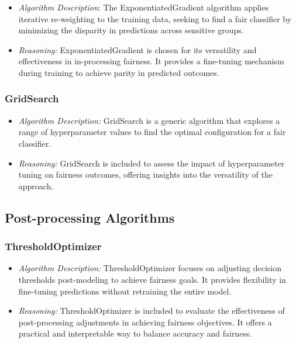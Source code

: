 \begin{itemize}

    \item \emph{Algorithm Description}: The ExponentiatedGradient algorithm applies iterative re-weighting to the training data, seeking to find a fair classifier by minimizing the disparity in predictions across sensitive groups.

    \item \emph{Reasoning:} ExponentiatedGradient is chosen for its versatility and effectiveness in in-processing fairness. It provides a fine-tuning mechanism during training to achieve parity in predicted outcomes.

\end{itemize}

\subsubsection{GridSearch}

\begin{itemize}

    \item \emph{Algorithm Description:} GridSearch is a generic algorithm that explores a range of hyperparameter values to find the optimal configuration for a fair classifier.

    \item \emph{Reasoning:} GridSearch is included to assess the impact of hyperparameter tuning on fairness outcomes, offering insights into the versatility of the approach.

\end{itemize}

\subsection{Post-processing Algorithms}

\subsubsection{ThresholdOptimizer}

\begin{itemize}

    \item \emph{Algorithm Description:} ThresholdOptimizer focuses on adjusting decision thresholds post-modeling to achieve fairness goals. It provides flexibility in fine-tuning predictions without retraining the entire model.

    \item \emph{Reasoning:} ThresholdOptimizer is included to evaluate the effectiveness of post-processing adjustments in achieving fairness objectives. It offers a practical and interpretable way to balance accuracy and fairness.

\end{itemize}

